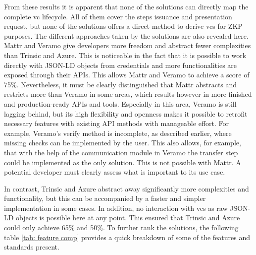     From these results it is apparent that none of the solutions can directly map the complete \ac{vc} lifecycle. All of them cover the steps issuance and presentation request, but none of the solutions offers a direct method to derive \acp{vc} for \ac{ZKP} purposes. The different approaches taken by the solutions are also revealed here. Mattr and Veramo give developers more freedom and abstract fewer complexities than Trinsic and Azure. This is noticeable in the fact that it is possible to work directly with JSON-LD objects from credentials and more functionalities are exposed through their APIs. This allows Mattr and Veramo to achieve a score of 75\%. Nevertheless, it must be clearly distinguished that Mattr abstracts and restricts more than Veramo in some areas, which results however in more finished and production-ready APIs and tools. Especially in this area, Veramo is still lagging behind, but its high flexibility and openness makes it possible to retrofit necessary features with existing API methods with manageable effort. For example, Veramo's verify method is incomplete, as described earlier, where missing checks can be implemented by the user. This also allows, for example, that with the help of the communication module in Veramo the transfer step could be implemented as the only solution. This is not possible with Mattr. A potential developer must clearly assess what is important to its use case.
    
    In contrast, Trinsic and Azure abstract away significantly more complexities and functionality, but this can be accompanied by a faster and simpler implementation in some cases. In addition, no interaction with \acp{vc} as raw JSON-LD objects is possible here at any point. This ensured that Trinsic and Azure could only achieve 65\% and 50\%. To further rank the solutions, the following table \ref{tab: feature comp} provides a quick breakdown of some of the features and standards present.

